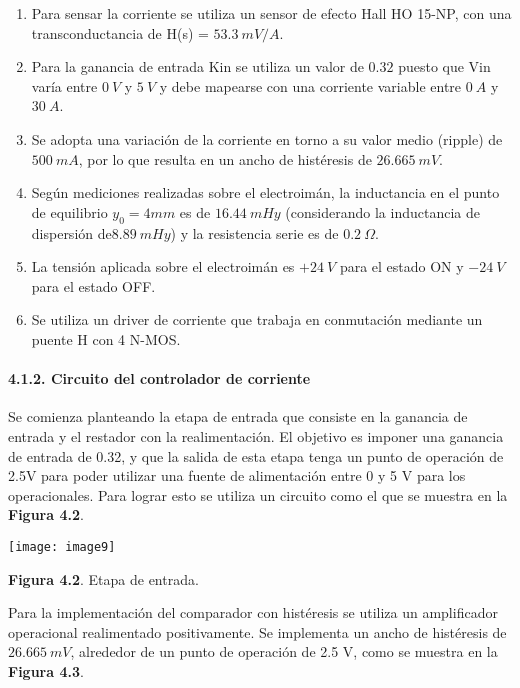\documentclass{article} %
\begin{document}
\begin{enumerate}
\item  Para sensar la corriente se utiliza un sensor de efecto Hall HO 15-NP, con una transconductancia de H(s) = $53.3\ mV/A$.

\item  Para la ganancia de entrada Kin se utiliza un valor de $0.32$ puesto que Vin var\'{i}a entre $0\ V$ y $5\ V$ y debe mapearse con una corriente variable entre $0\ A$ y $30\ A$.

\item  Se adopta una variaci\'{o}n de la corriente en torno a su valor medio (ripple) de $500\ mA$, por lo que resulta en un ancho de hist\'{e}resis de $26.665\ mV$.

\item  Seg\'{u}n mediciones realizadas sobre el electroim\'{a}n, la inductancia en el punto de equilibrio $y_0=4mm$ es de $16.44\ mHy$ (considerando la inductancia de dispersi\'{o}n de$8.89\ mHy$) y la resistencia serie es de $0.2\ \mathit{\Omega}$.

\item  La tensi\'{o}n aplicada sobre el electroim\'{a}n es $+24\ V$ para el estado ON y $-24\ V$ para el estado OFF.

\item  Se utiliza un driver de corriente que trabaja en conmutaci\'{o}n mediante un puente H con 4 N-MOS. 
\end{enumerate}

\noindent 
\paragraph{4.1.2. Circuito del controlador de corriente}

\noindent Se comienza planteando la etapa de entrada que consiste en la ganancia de entrada y el restador con la realimentaci\'{o}n. El objetivo es imponer una ganancia de entrada de 0.32, y que la salida de esta etapa tenga un punto de operaci\'{o}n de 2.5V para poder utilizar una fuente de alimentaci\'{o}n entre 0 y 5 V para los operacionales. Para lograr esto se utiliza un circuito como el que se muestra en la \textbf{Figura 4.2}.

\noindent 

\noindent \texttt{[image: image9]}

\noindent \textbf{Figura 4.2}. Etapa de entrada.

\noindent 

\noindent Para la implementaci\'{o}n del comparador con hist\'{e}resis se utiliza un amplificador operacional realimentado positivamente. Se implementa un ancho de hist\'{e}resis de $26.665\ mV$,  alrededor de un punto de operaci\'{o}n de 2.5 V, como se muestra en la \textbf{Figura 4.3}.
\end{document}
